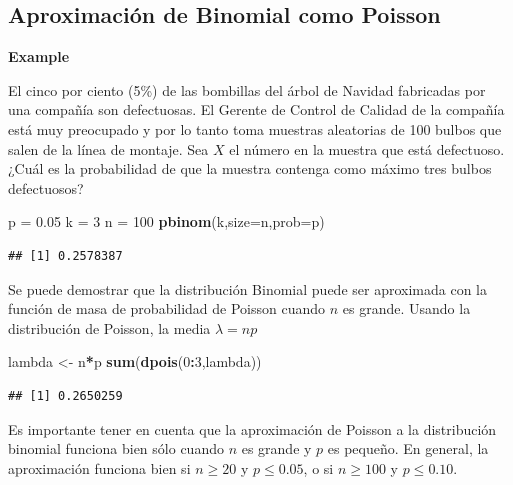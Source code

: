 \documentclass[]{book}
\newenvironment{Shaded}{\begin{snugshade}}{\end{snugshade}}
\newcommand{\KeywordTok}[1]{\textcolor[rgb]{0.13,0.29,0.53}{\textbf{#1}}}
\newcommand{\DataTypeTok}[1]{\textcolor[rgb]{0.13,0.29,0.53}{#1}}
\newcommand{\DecValTok}[1]{\textcolor[rgb]{0.00,0.00,0.81}{#1}}
\newcommand{\FloatTok}[1]{\textcolor[rgb]{0.00,0.00,0.81}{#1}}
\newcommand{\StringTok}[1]{\textcolor[rgb]{0.31,0.60,0.02}{#1}}
\newcommand{\OperatorTok}[1]{\textcolor[rgb]{0.81,0.36,0.00}{\textbf{#1}}}
\newcommand{\NormalTok}[1]{#1}
\begin{document}
\subsection{Aproximación de Binomial como
Poisson}\label{aproximaciuxf3n-de-binomial-como-poisson}

\textbf{Example}

El cinco por ciento (5\%) de las bombillas del árbol de Navidad
fabricadas por una compañía son defectuosas. El Gerente de Control de
Calidad de la compañía está muy preocupado y por lo tanto toma muestras
aleatorias de 100 bulbos que salen de la línea de montaje. Sea \(X\) el
número en la muestra que está defectuoso. ¿Cuál es la probabilidad de
que la muestra contenga como máximo tres bulbos defectuosos?

\begin{Shaded}
\begin{Highlighting}[]
\NormalTok{p =}\StringTok{ }\FloatTok{0.05}
\NormalTok{k =}\StringTok{ }\DecValTok{3}
\NormalTok{n =}\StringTok{ }\DecValTok{100}
\KeywordTok{pbinom}\NormalTok{(k,}\DataTypeTok{size=}\NormalTok{n,}\DataTypeTok{prob=}\NormalTok{p)}
\end{Highlighting}
\end{Shaded}

\begin{verbatim}
## [1] 0.2578387
\end{verbatim}

Se puede demostrar que la distribución Binomial puede ser aproximada con
la función de masa de probabilidad de Poisson cuando \(n\) es grande.
Usando la distribución de Poisson, la media \(\lambda = np\)

\begin{Shaded}
\begin{Highlighting}[]
\NormalTok{lambda <-}\StringTok{ }\NormalTok{n}\OperatorTok{*}\NormalTok{p}
\KeywordTok{sum}\NormalTok{(}\KeywordTok{dpois}\NormalTok{(}\DecValTok{0}\OperatorTok{:}\DecValTok{3}\NormalTok{,lambda))}
\end{Highlighting}
\end{Shaded}

\begin{verbatim}
## [1] 0.2650259
\end{verbatim}

Es importante tener en cuenta que la aproximación de Poisson a la
distribución binomial funciona bien sólo cuando \(n\) es grande y \(p\)
es pequeño. En general, la aproximación funciona bien si \(n \geq 20\) y
\(p\leq0.05\), o si \(n\geq 100\) y \(p\leq 0.10\).
\end{document}
